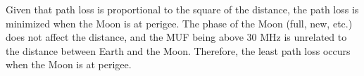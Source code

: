 Given that path loss is proportional to the square of the distance, the path loss is minimized when the Moon is at perigee. The phase of the Moon (full, new, etc.) does not affect the distance, and the MUF being above 30 MHz is unrelated to the distance between Earth and the Moon. Therefore, the least path loss occurs when the Moon is at perigee.

